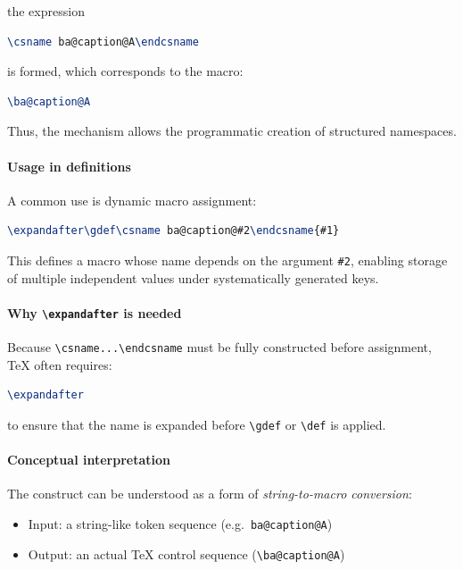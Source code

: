 the expression

\begin{lstlisting}[language=LaTeX]
\csname ba@caption@A\endcsname
\end{lstlisting}

is formed, which corresponds to the macro:

\begin{lstlisting}[language=LaTeX]
\ba@caption@A
\end{lstlisting}

Thus, the mechanism allows the programmatic creation of structured namespaces.



\paragraph{Usage in definitions}

A common use is dynamic macro assignment:

\begin{lstlisting}[language=LaTeX]
\expandafter\gdef\csname ba@caption@#2\endcsname{#1}
\end{lstlisting}

This defines a macro whose name depends on the argument \verb|#2|, enabling storage of multiple independent values under systematically generated keys.



\paragraph{Why \texttt{\textbackslash expandafter} is needed}

Because \verb|\csname...\endcsname| must be fully constructed before assignment, TeX often requires:

\begin{lstlisting}[language=LaTeX]
\expandafter
\end{lstlisting}

to ensure that the name is expanded before \verb|\gdef| or \verb|\def| is applied.



\paragraph{Conceptual interpretation}

The construct can be understood as a form of \emph{string-to-macro conversion}:

\begin{itemize}
\item Input: a string-like token sequence (e.g.\ \texttt{ba@caption@A})
\item Output: an actual TeX control sequence (\verb|\ba@caption@A|)
\end{itemize}


